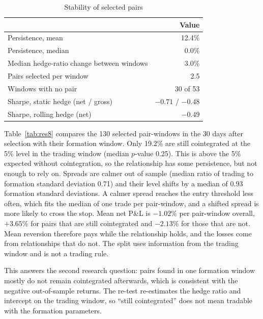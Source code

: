 \documentclass[10pt,a4paper,twocolumn]{article}
\begin{document}
\begin{table}[htbp]
	\centering
	\small
	\caption{Stability of selected pairs }
	\label{tab:res6}
	\begin{tabularx}{\columnwidth}{@{}Xr@{}}
		\toprule
		& Value \\
		\midrule
		Persistence, mean & 12.4\% \\
		Persistence, median & 0.0\% \\
		Median hedge-ratio change between windows & 3.0\% \\
		Pairs selected per window & 2.5 \\
		Windows with no pair & 30 of 53 \\
		Sharpe, static hedge (net / gross) & $-0.71$ / $-0.48$ \\
		Sharpe, rolling hedge (net) & $-0.49$ \\
		\bottomrule
	\end{tabularx}
\end{table}

Table~\ref{tab:res8} compares the 130 selected pair-windows in the 30 days after selection with their formation window. Only 19.2\% are still cointegrated at the 5\% level in the trading window (median $p$-value 0.25). This is above the 5\% expected without cointegration, so the relationship has some persistence, but not enough to rely on. Spreads are calmer out of sample (median ratio of trading to formation standard deviation 0.71) and their level shifts by a median of 0.93 formation standard deviations. A calmer spread reaches the entry threshold less often, which fits the median of one trade per pair-window, and a shifted spread is more likely to cross the stop. Mean net P\&L is $-1.02\%$ per pair-window overall, $+3.65\%$ for pairs that are still cointegrated and $-2.13\%$ for those that are not. Mean reversion therefore pays while the relationship holds, and the losses come from relationships that do not. The split uses information from the trading window and is not a trading rule.

This answers the second research question: pairs found in one formation window mostly do not remain cointegrated afterwards, which is consistent with the negative out-of-sample returns. The re-test re-estimates the hedge ratio and intercept on the trading window, so ``still cointegrated'' does not mean tradable with the formation parameters.
\end{document}
